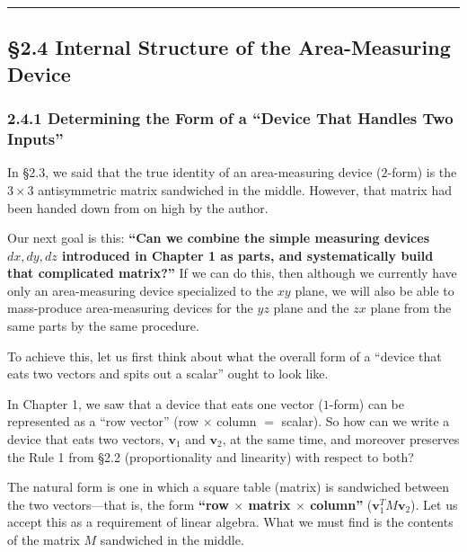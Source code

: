 \begin{center}\rule{0.5\linewidth}{0.5pt}\end{center}

\hypertarget{internal-structure-of-the-area-measuring-device}{%
\subsection{§2.4 Internal Structure of the Area-Measuring
Device}\label{internal-structure-of-the-area-measuring-device}}

\hypertarget{determining-the-form-of-a-device-that-handles-two-inputs}{%
\subsubsection{2.4.1 Determining the Form of a ``Device That Handles Two
Inputs''}\label{determining-the-form-of-a-device-that-handles-two-inputs}}

In §2.3, we said that the true identity of an area-measuring device
(\(2\)-form) is the \(3 \times 3\) antisymmetric matrix sandwiched in
the middle. However, that matrix had been handed down from on high by
the author.

Our next goal is this: \textbf{``Can we combine the simple measuring
devices \(dx, dy, dz\) introduced in Chapter 1 as parts, and
systematically build that complicated matrix?''} If we can do this, then
although we currently have only an area-measuring device specialized to
the \(xy\) plane, we will also be able to mass-produce area-measuring
devices for the \(yz\) plane and the \(zx\) plane from the same parts by
the same procedure.

To achieve this, let us first think about what the overall form of a
``device that eats two vectors and spits out a scalar'' ought to look
like.

In Chapter 1, we saw that a device that eats one vector (\(1\)-form) can
be represented as a ``row vector'' (row \(\times\) column \(=\) scalar).
So how can we write a device that eats two vectors, \(\mathbf{v}_1\) and
\(\mathbf{v}_2\), at the same time, and moreover preserves the Rule 1
from §2.2 (proportionality and linearity) with respect to both?

The natural form is one in which a square table (matrix) is sandwiched
between the two vectors---that is, the form \textbf{``row \(\times\)
matrix \(\times\) column''} (\(\mathbf{v}_1^T M \mathbf{v}_2\)). Let us
accept this as a requirement of linear algebra. What we must find is the
contents of the matrix \(M\) sandwiched in the middle.

